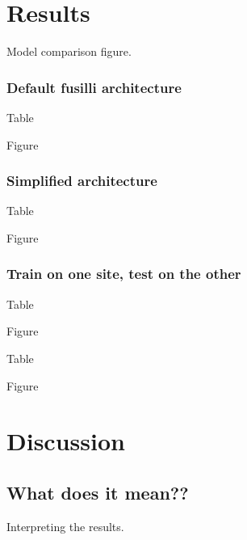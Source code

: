 \section{Results}
Model comparison figure.

\subsubsection{Default fusilli architecture}

Table

Figure

\subsubsection{Simplified architecture}
Table

Figure

\subsubsection{Train on one site, test on the other}


Table

Figure


Table

Figure

\section{Discussion}
\subsection{What does it mean??}
Interpreting the results.

